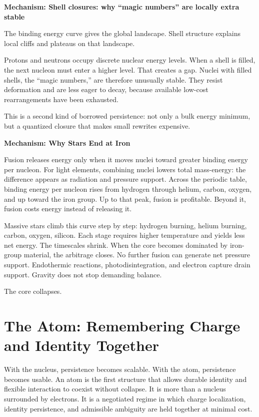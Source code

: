 \documentclass[11pt,twoside,openright]{book}
\newenvironment{mechanismbox}[1]
  {\begin{framed}\noindent\textbf{Mechanism: #1}\par\medskip}
  {\end{framed}}
\begin{document}
\begin{mechanismbox}{Shell closures: why ``magic numbers'' are locally extra stable}
The binding energy curve gives the global landscape.
Shell structure explains local cliffs and plateaus on that landscape.

Protons and neutrons occupy discrete nuclear energy levels. When a shell is filled, the next nucleon must enter a higher level. That creates a gap. Nuclei with filled shells, the ``magic numbers,'' are therefore unusually stable. They resist deformation and are less eager to decay, because available low-cost rearrangements have been exhausted.

This is a second kind of borrowed persistence:
not only a bulk energy minimum,
but a quantized closure that makes small rewrites expensive.
\end{mechanismbox}
\begin{mechanismbox}{Why Stars End at Iron}

Fusion releases energy only when it moves nuclei toward greater binding energy per nucleon. For light elements, combining nuclei lowers total mass-energy: the difference appears as radiation and pressure support. Across the periodic table, binding energy per nucleon rises from hydrogen through helium, carbon, oxygen, and up toward the iron group. Up to that peak, fusion is profitable. Beyond it, fusion costs energy instead of releasing it.

Massive stars climb this curve step by step: hydrogen burning, helium burning, carbon, oxygen, silicon. Each stage requires higher temperature and yields less net energy. The timescales shrink. When the core becomes dominated by iron-group material, the arbitrage closes. No further fusion can generate net pressure support. Endothermic reactions, photodisintegration, and electron capture drain support. Gravity does not stop demanding balance.

The core collapses.

\end{mechanismbox}
\chapter{The Atom: Remembering Charge and Identity Together}

With the nucleus, persistence becomes scalable. With the atom, persistence becomes usable. An atom is the first structure that allows durable identity and flexible interaction to coexist without collapse. It is more than a nucleus surrounded by electrons. It is a negotiated regime in which charge localization, identity persistence, and admissible ambiguity are held together at minimal cost.
\end{document}
